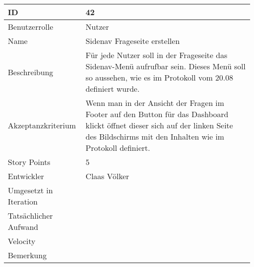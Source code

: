 \begin{tabularx}{\textwidth}{|p{}|X|}
	\hline
	ID & 42 \\
	\hline
	Benutzerrolle & Nutzer \\
	\hline
	Name & Sidenav Frageseite erstellen\\
	\hline
	Beschreibung & Für jede Nutzer soll in der Frageseite das Sidenav-Menü aufrufbar sein. Dieses Menü soll so aussehen, wie es im Protokoll vom 20.08 definiert wurde.\\
	\hline
	Akzeptanzkriterium & Wenn man in der Ansicht der Fragen im Footer auf den Button für das Dashboard klickt öffnet dieser sich auf der linken Seite des Bildschirms mit den Inhalten wie im Protokoll definiert. \\
	\hline
	Story Points & 5\\
	\hline
	Entwickler & Claas Völker\\
	\hline
	Umgesetzt in Iteration & \\
	\hline
	Tatsächlicher Aufwand & \\
	\hline
	Velocity & \\
	\hline
	Bemerkung & \\
	\hline
\end{tabularx}
\vspace{20pt}
